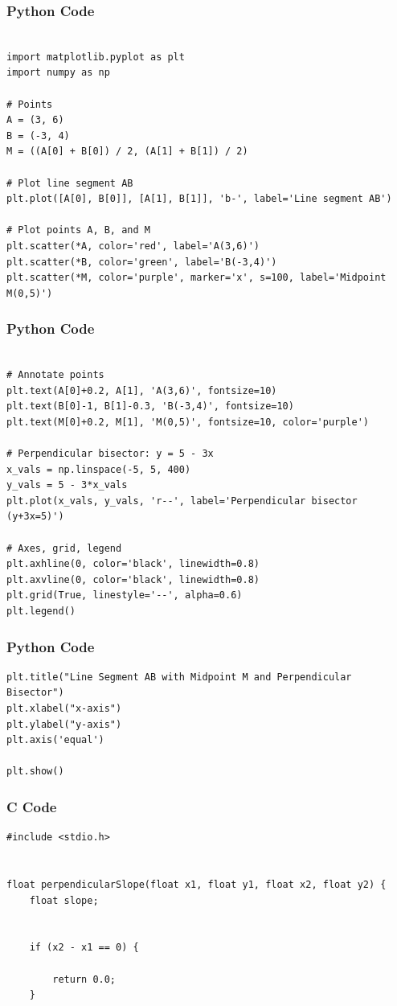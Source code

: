 \documentclass{beamer}
\begin{document}
\begin{frame}[fragile]
    \frametitle{Python Code}
    \begin{lstlisting}

import matplotlib.pyplot as plt
import numpy as np

# Points
A = (3, 6)
B = (-3, 4)
M = ((A[0] + B[0]) / 2, (A[1] + B[1]) / 2)

# Plot line segment AB
plt.plot([A[0], B[0]], [A[1], B[1]], 'b-', label='Line segment AB')

# Plot points A, B, and M
plt.scatter(*A, color='red', label='A(3,6)')
plt.scatter(*B, color='green', label='B(-3,4)')
plt.scatter(*M, color='purple', marker='x', s=100, label='Midpoint M(0,5)')

\end{lstlisting}
\end{frame}

\begin{frame}[fragile]
    \frametitle{Python Code}
    \begin{lstlisting}

# Annotate points
plt.text(A[0]+0.2, A[1], 'A(3,6)', fontsize=10)
plt.text(B[0]-1, B[1]-0.3, 'B(-3,4)', fontsize=10)
plt.text(M[0]+0.2, M[1], 'M(0,5)', fontsize=10, color='purple')

# Perpendicular bisector: y = 5 - 3x
x_vals = np.linspace(-5, 5, 400)
y_vals = 5 - 3*x_vals
plt.plot(x_vals, y_vals, 'r--', label='Perpendicular bisector (y+3x=5)')

# Axes, grid, legend
plt.axhline(0, color='black', linewidth=0.8)
plt.axvline(0, color='black', linewidth=0.8)
plt.grid(True, linestyle='--', alpha=0.6)
plt.legend()

\end{lstlisting}
\end{frame}

\begin{frame}[fragile]
    \frametitle{Python Code}
    \begin{lstlisting}
plt.title("Line Segment AB with Midpoint M and Perpendicular Bisector")
plt.xlabel("x-axis")
plt.ylabel("y-axis")
plt.axis('equal')

plt.show()

\end{lstlisting}
\end{frame}
\begin{frame}[fragile]
    \frametitle{C Code}
    \begin{lstlisting}
#include <stdio.h>


float perpendicularSlope(float x1, float y1, float x2, float y2) {
    float slope;

    
    if (x2 - x1 == 0) {
        
        return 0.0;  
    }

   
        
       
    \end{lstlisting}
\end{frame}
\end{document}

